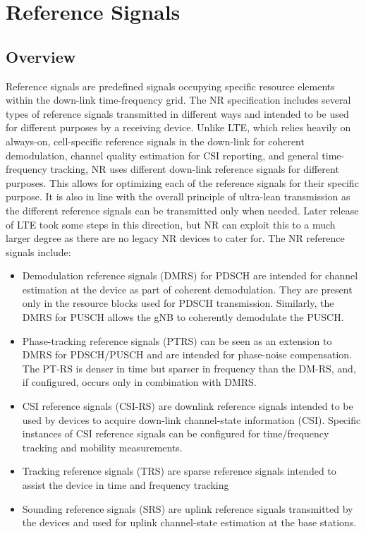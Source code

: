 \chapter{Reference Signals}

\section{Overview}
Reference signals are predefined signals occupying specific resource elements within the down-link time-frequency grid. The NR specification includes several types of reference signals transmitted in different ways and intended to be used for different purposes by a receiving device.
\newline
Unlike LTE, which relies heavily on always-on, cell-specific reference signals in the down-link for coherent demodulation, channel quality estimation for CSI reporting, and general time-frequency tracking, NR uses different down-link reference signals for different purposes. This allows for optimizing each of the reference signals for their specific purpose. It is also in line with the overall principle of ultra-lean transmission as the different reference signals can be transmitted only when needed. Later release of LTE took some steps in this direction, but NR can exploit this to a much larger degree as there are no legacy NR devices to cater for.
\newline
The NR reference signals include:
\begin{itemize}
    \item Demodulation reference signals (DMRS) for PDSCH are intended for channel estimation at the device as part of coherent demodulation. They are present only in the resource blocks used for PDSCH transmission. Similarly, the DMRS for PUSCH allows the gNB to coherently demodulate the PUSCH.
    \item Phase-tracking reference signals (PTRS) can be seen as an extension to DMRS for PDSCH/PUSCH and are intended for phase-noise compensation. The PT-RS is denser in time but sparser in frequency than the DM-RS, and, if configured, occurs only in combination with DMRS.
    \item CSI reference signals (CSI-RS) are downlink reference signals intended to be used by devices to acquire down-link channel-state information (CSI). Specific instances of CSI reference signals can be configured for time/frequency tracking and mobility measurements.
    \item Tracking reference signals (TRS) are sparse reference signals intended to assist the device in time and frequency tracking
    \item Sounding reference signals (SRS) are uplink reference signals transmitted by the devices and used for uplink channel-state estimation at the base stations.
\end{itemize}

